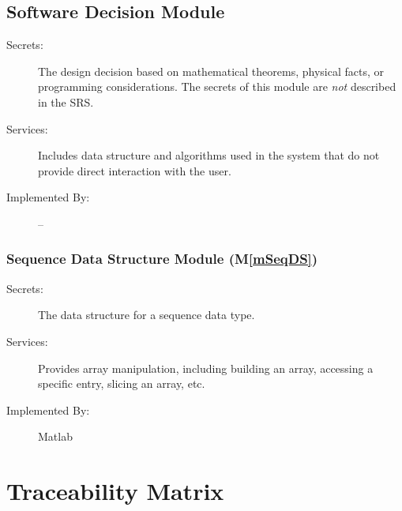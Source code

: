 \documentclass[12pt]{article}
\newcommand{\mref}[1]{M\ref{#1}}
\begin{document}
\subsection{Software Decision Module}

\begin{description}
\item[Secrets:] The design decision based on mathematical theorems, physical
  facts, or programming considerations. The secrets of this module are
  \emph{not} described in the SRS.
\item[Services:] Includes data structure and algorithms used in the system that
  do not provide direct interaction with the user. 
\item[Implemented By:] --
\end{description}

\subsubsection{Sequence Data Structure Module (\mref{mSeqDS})}

\begin{description}
\item[Secrets:] The data structure for a sequence data type.
\item[Services:] Provides array manipulation, including building an array,
  accessing a specific entry, slicing an array, etc.
\item[Implemented By:] Matlab
\end{description}

%

\section{Traceability Matrix} \label{SecTM}
\end{document}
